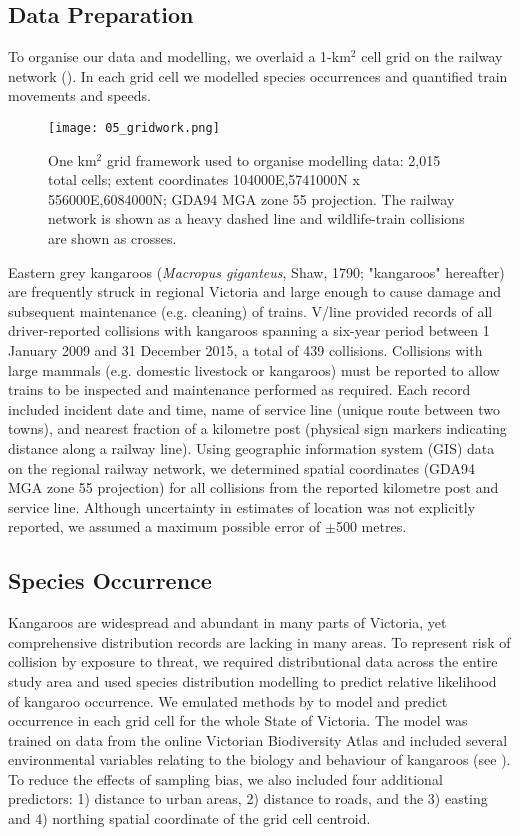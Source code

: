 \subsection{Data Preparation}

To organise our data and modelling, we overlaid a 1-km$^2$ cell grid on the railway network ().  In each grid cell we modelled species occurrences and quantified train movements and speeds.

\begin{figure*}[!t]
  \centering
  \texttt{[image: 05\_gridwork.png]}
  \caption[Grid framework used to organise modelling data]{One km$^2$ grid framework used to organise modelling data: 2,015 total cells; extent coordinates 104000E,5741000N x 556000E,6084000N; GDA94 MGA zone 55 projection. The railway network is shown as a heavy dashed line and wildlife-train collisions are shown as crosses.}
  \label{trains_grid}
\end{figure*}

Eastern grey kangaroos (\textit{Macropus giganteus}, Shaw, 1790; "kangaroos" hereafter) are frequently struck in regional Victoria and large enough to cause damage and subsequent maintenance (e.g. cleaning) of trains.  V/line provided records of all driver-reported collisions with kangaroos spanning a six-year period between 1 January 2009 and 31 December 2015, a total of 439 collisions. Collisions with large mammals (e.g. domestic livestock or kangaroos) must be reported to allow trains to be inspected and maintenance performed as required. Each record included incident date and time, name of service line (unique route between two towns), and nearest fraction of a kilometre post (physical sign markers indicating distance along a railway line).  Using geographic information system (GIS) data on the regional railway network, we determined spatial coordinates (GDA94 MGA zone 55 projection) for all collisions from the reported kilometre post and service line. Although uncertainty in estimates of location was not explicitly reported, we assumed a maximum possible error of $\pm$500 metres.

\subsection{Species Occurrence}

Kangaroos are widespread \citep{daws12} and abundant in many parts of Victoria, yet comprehensive distribution records are lacking in many areas. To represent risk of collision by exposure to threat, we required distributional data across the entire study area and used species distribution modelling to predict relative likelihood of kangaroo occurrence.  We emulated methods by \cite{elit08} to model and predict occurrence in each grid cell for the whole State of Victoria. The model was trained on data from the online Victorian Biodiversity Atlas \citep{depi16} and included several environmental variables relating to the biology and behaviour of kangaroos (see ).  To reduce the effects of sampling bias, we also included four additional predictors:  1) distance to urban areas, 2) distance to roads, and the 3) easting and 4) northing spatial coordinate of the grid cell centroid.

